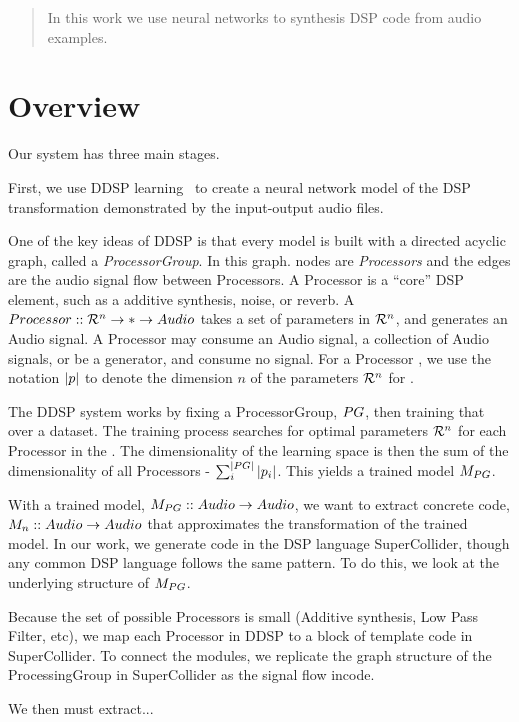 \documentclass[12pt]{article}
\begin{document}
\maketitle

\begin{abstract}
In this work we use neural networks to synthesis DSP code from audio examples.
\end{abstract}

\section{Overview}

Our system has three main stages.

First, we use DDSP learning~\cite{} to create a neural network model of the DSP transformation demonstrated by the input-output audio files.

One of the key ideas of DDSP is that every model is built with a directed acyclic graph, called a \textit{ProcessorGroup}.
In this graph. nodes are \textit{Processors} and the edges are the audio signal flow between Processors.
A Processor is a ``core'' DSP element, such as a additive synthesis, noise, or reverb.
A $Processor :: \mathcal{R}^n \to * \to Audio$ takes a set of parameters in $\mathcal{R}^n$, and generates an Audio signal.
A Processor may consume an Audio signal, a collection of Audio signals, or be a generator, and consume no signal.
For a Processor \processor, we use the notation $|p|$ to denote the dimension $n$ of the parameters $\mathcal{R}^n$ for \processor.

The DDSP system works by fixing a ProcessorGroup, $PG$, then training that over a dataset.
The training process searches for optimal parameters $\mathcal{R}^n$ for each Processor in the \processorGroup.
The dimensionality of the learning space  is then the sum of the dimensionality of all Processors - $\sum_{i}^{|PG|} |p_i|$.
This yields a trained model $M_{PG}$.


With a trained model, $M_{PG} :: Audio \to Audio$, we want to extract concrete code, $M_n :: Audio \to Audio$ that approximates the transformation of the trained model.
In our work, we generate code in the DSP language SuperCollider, though any common DSP language follows the same pattern.
To do this, we look at the underlying structure of $M_{PG}$.

Because the set of possible Processors is small (Additive synthesis, Low Pass Filter, etc), we map each Processor in DDSP to a block of template code in SuperCollider.
To connect the modules, we replicate the graph structure of the ProcessingGroup in SuperCollider as the signal flow incode.

We then must extract...





\end{document}
